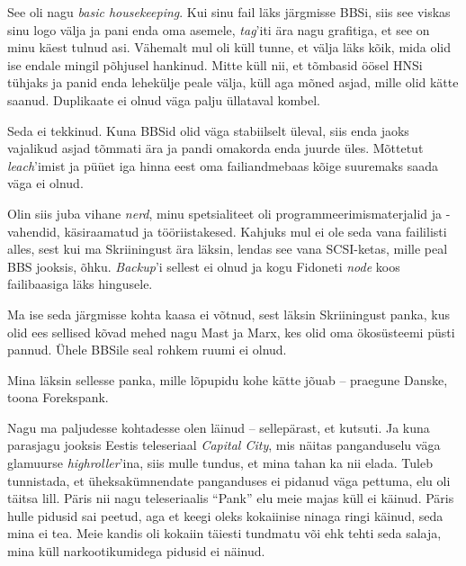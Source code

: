 See oli nagu \emph{basic housekeeping}. Kui sinu fail läks 
järgmisse BBSi, siis see viskas sinu logo välja ja pani enda oma 
asemele, \emph{tag}'iti ära nagu grafitiga, et see on 
minu käest tulnud asi. Vähemalt mul oli küll tunne, et välja läks 
kõik, mida olid ise endale mingil põhjusel hankinud. Mitte küll nii, et 
tõmbasid öösel HNSi tühjaks ja 
panid enda lehekülje peale välja, küll aga mõned asjad, mille olid kätte 
saanud. Duplikaate ei olnud väga palju üllataval kombel.


Seda ei tekkinud. Kuna BBSid olid väga stabiilselt üleval, siis enda jaoks 
vajalikud asjad tõmmati
ära ja pandi omakorda enda juurde üles. Mõttetut \emph{leach}'imist ja püüet 
iga hinna eest oma failiandmebaas kõige suuremaks saada 
väga ei olnud. 


Olin siis juba vihane \emph{nerd}, minu spetsialiteet oli 
programmeerimismaterjalid ja -vahendid, käsiraamatud ja
tööriistakesed. 
Kahjuks mul ei ole seda vana faililisti alles, sest kui ma Skriiningust ära 
läksin, lendas see vana SCSI-ketas, 
mille peal BBS jooksis, õhku. \emph{Backup}'i sellest ei olnud ja 
kogu Fidoneti \emph{node} koos failibaasiga läks hingusele.

Ma ise seda järgmisse kohta kaasa ei võtnud, sest läksin Skriiningust panka, 
kus 
olid ees sellised kõvad mehed nagu Mast ja 
Marx, kes 
olid oma ökosüsteemi püsti pannud. Ühele BBSile seal rohkem ruumi ei olnud. 


Mina läksin sellesse panka, mille lõpupidu kohe 
kätte jõuab – 
praegune Danske, toona Forekspank. 


Nagu ma paljudesse kohtadesse olen läinud – sellepärast, et kutsuti. Ja 
kuna parasjagu jooksis Eestis teleseriaal \emph{Capital City}, mis 
näitas panganduselu väga glamuurse \emph{highroller}'ina, siis mulle tundus, 
et mina tahan ka nii elada. Tuleb tunnistada, et üheksakümnendate panganduses  
ei pidanud väga pettuma, elu oli täitsa lill. Päris nii nagu 
teleseriaalis \enquote{Pank} elu meie majas küll ei käinud. 
Päris hulle pidusid sai peetud, aga et keegi oleks kokaiinise  
ninaga ringi käinud, seda mina ei tea. Meie kandis oli kokaiin täiesti 
tundmatu või ehk tehti seda salaja, mina küll
narkootikumidega pidusid ei näinud.

